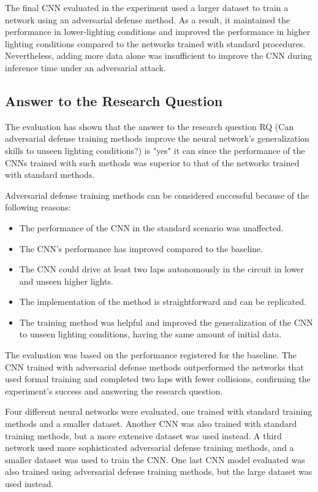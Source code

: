 \documentclass[12pt]{article}
\begin{document}
The final CNN evaluated in the experiment used a larger dataset to train a network using an adversarial defense method. As a result, it maintained the performance in lower-lighting conditions and improved the performance in higher lighting conditions compared to the networks trained with standard procedures. Nevertheless, adding more data alone was insufficient to improve the CNN during inference time under an adversarial attack.

\subsection{Answer to the Research Question}

The evaluation has shown that the answer to the research question RQ (Can adversarial defense training methods improve the neural network's generalization skills to unseen lighting conditions?) is "yes" it can since the performance of the CNNs trained with such methods was superior to that of the networks trained with standard methods.

Adversarial defense training methods can be considered successful because of the following reasons:

\begin{itemize}
   \item The performance of the CNN in the standard scenario was unaffected.
   \item The CNN's performance has improved compared to the baseline.
   \item The CNN could drive at least two laps autonomously in the circuit in lower and unseen higher lights.
   \item The implementation of the method is straightforward and can be replicated.
   \item The training method was helpful and improved the generalization of the CNN to unseen lighting conditions, having the same amount of initial data.
\end{itemize}

The evaluation was based on the performance registered for the baseline. The CNN trained with adversarial defense methods outperformed the networks that used formal training and completed two laps with fewer collisions, confirming the experiment's success and answering the research question.

Four different neural networks were evaluated, one trained with standard training methods and a smaller dataset. Another CNN was also trained with standard training methods, but a more extensive dataset was used instead. A third network used more sophisticated adversarial defense training methods, and a smaller dataset was used to train the CNN. One last CNN model evaluated was also trained using adversarial defense training methods, but the large dataset was used instead.
\end{document}
